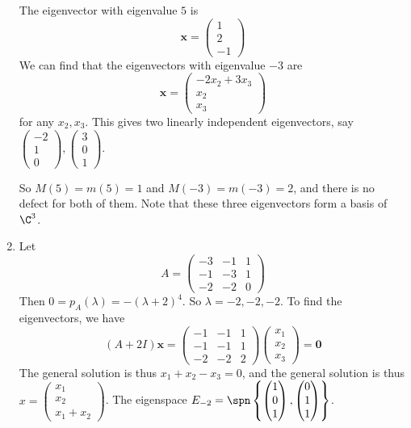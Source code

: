 \documentclass[a4paper]{article}
\begin{document}
\begin{eg}
\begin{enumerate}
      The eigenvector with eigenvalue $5$ is
      \[
        \mathbf{x} =
        \begin{pmatrix}
          1\\2\\-1
        \end{pmatrix}
      \]
      We can find that the eigenvectors with eigenvalue $-3$ are
      \[
        \mathbf{x} =
        \begin{pmatrix}
          -2x_2 + 3x_3\\x_2\\x_3
        \end{pmatrix}
      \]
      for any $x_2, x_3$. This gives two linearly independent eigenvectors, say $
      \begin{pmatrix}
        -2\\1\\0
      \end{pmatrix},
      \begin{pmatrix}
        3\\0\\1
      \end{pmatrix}$.

      So $M(5) = m(5) = 1$ and $M(-3) = m(-3) = 2$, and there is no defect for both of them. Note that these three eigenvectors form a basis of $\C^3$.
    \item Let
      \[
        A = \begin{pmatrix}
          -3&-1&1\\
          -1 & -3 & 1\\
          -2 & -2 & 0
        \end{pmatrix}
      \]
      Then $0 = p_A(\lambda) = -(\lambda+2)^4$. So $\lambda = -2, -2, -2$. To find the eigenvectors, we have
      \[
        (A + 2I)\mathbf{x} =
        \begin{pmatrix}
          -1&-1&1\\
          -1 & -1 & 1\\
          -2 & -2 & 2
        \end{pmatrix}
        \begin{pmatrix}
          x_1\\x_2\\x_3
        \end{pmatrix}
        = \mathbf{0}
      \]
      The general solution is thus $x_1 + x_2 - x_3 = 0$, and the general solution is thus $x =
      \begin{pmatrix}
        x_1\\x_2\\x_1 + x_2
      \end{pmatrix}$. The eigenspace $E_{-2} = \spn\left\{
        \begin{pmatrix}
          1\\0\\1
        \end{pmatrix},
        \begin{pmatrix}
          0\\1\\1
        \end{pmatrix}\right\}$.


\end{enumerate}
\end{eg}
\end{document}
